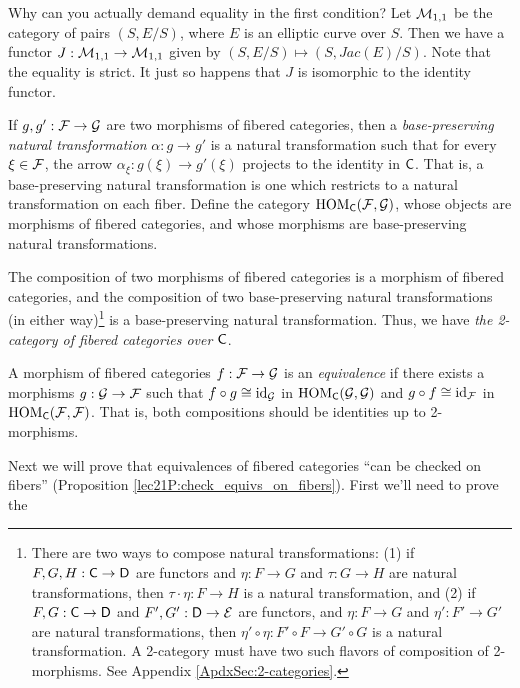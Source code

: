  Why can you actually demand equality in the first condition? Let $\mathcal{M}_{1,1}$ be the
 category of pairs $(S,E/S)$, where $E$ is an elliptic curve over $S$. Then we have a
 functor $J:\mathcal{M}_{1,1}\to \mathcal{M}_{1,1}$ given by $(S,E/S)\mapsto (S,Jac(E)/S)$. Note that the
 equality is strict. It just so happens that $J$ is isomorphic to the identity functor.
 \begin{definition}
   If $g,g':\mathcal{F}\to \mathcal{G}$ are two morphisms of fibered categories, then a \emph{base-preserving
   natural transformation} $\alpha:g\to g'$ is a natural transformation such that for
   every $\xi\in \mathcal{F}$, the arrow $\alpha_\xi:g(\xi)\to g'(\xi)$ projects to the identity in
   $\text{\sf C}$. That is, a base-preserving natural transformation is one which restricts to a
   natural transformation on each fiber. Define the category $\operatorname{HOM}_{\text{\sf C}}(\mathcal{F},\mathcal{G})$, whose
   objects are morphisms of fibered categories, and whose morphisms are base-preserving
   natural transformations.
 \end{definition}
 \begin{remark}
   The composition of two morphisms of fibered categories is a morphism of fibered
   categories, and the composition of two base-preserving natural transformations (in
   either way)\footnote{There are two ways to compose natural transformations: (1) if
   $F,G,H:\text{\sf C}\to \text{\sf D}$ are functors and $\eta:F\to G$ and $\tau:G\to H$ are natural
   transformations, then $\tau\cdot \eta:F\to H$ is a natural transformation, and (2) if
   $F,G:\text{\sf C}\to \text{\sf D}$ and $F',G':\text{\sf D}\to \mathcal{E}$ are functors, and $\eta:F\to G$ and $\eta':F'\to
   G'$ are natural transformations, then $\eta'\circ\eta:F'\circ F\to G'\circ G$ is a
   natural transformation. A 2-category must have two such flavors of composition of
   2-morphisms. See Appendix \ref{ApdxSec:2-categories}.} is a base-preserving natural transformation. Thus, we have \emph{the
   2-category of fibered categories over $\text{\sf C}$}.
 \end{remark}
 \begin{definition}
   A morphism of fibered categories $f:\mathcal{F}\to \mathcal{G}$ is an \emph{equivalence} if there exists a
   morphisms $g:\mathcal{G}\to \mathcal{F}$ such that $f\circ g\cong \operatorname{id}_{\mathcal{G}}$ in $\operatorname{HOM}_{\text{\sf C}}(\mathcal{G},\mathcal{G})$ and $g\circ
   f\cong \operatorname{id}_{\mathcal{F}}$ in $\operatorname{HOM}_{\text{\sf C}}(\mathcal{F},\mathcal{F})$. That is, both compositions should be identities up to
   2-morphisms.
 \end{definition}
 Next we will prove that equivalences of fibered categories ``can be checked on fibers''
 (Proposition \ref{lec21P:check_equivs_on_fibers}). First we'll need to prove the
